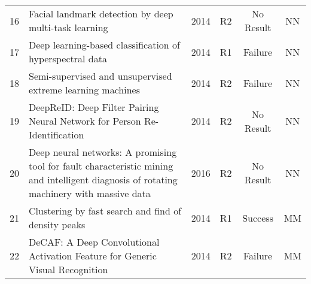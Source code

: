 \begin{tabularx}{\textwidth}{cXcccc}
 16 &  Facial landmark detection by deep multi-task learning &  2014 &  R2 &  No Result &  NN \\
 17 &  Deep learning-based classification of hyperspectral data &  2014 &  R1 &  Failure &  NN \\
 18 &  Semi-supervised and unsupervised extreme learning machines &  2014 &  R2 &  Failure &  NN \\
 19 &  DeepReID: Deep Filter Pairing Neural Network for Person Re-Identification &  2014 &  R2 &  No Result &  NN \\
 20 &  Deep neural networks: A promising tool for fault characteristic mining and intelligent diagnosis of rotating machinery with massive data &  2016 &  R2 &  No Result &  NN \\
 21 &  Clustering by fast search and find of density peaks &  2014 &  R1 &  Success &  MM \\
 22 &  DeCAF: A Deep Convolutional Activation Feature for Generic Visual Recognition &  2014 &  R2 &  Failure &  MM \\
\bottomrule
\end{tabularx}
